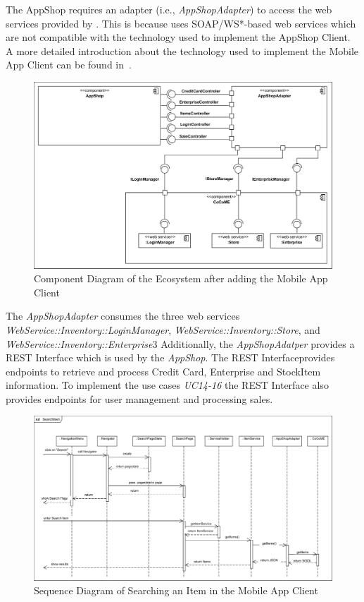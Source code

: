 The AppShop requires an adapter (i.e., \textit{AppShopAdapter}) to access the web services provided by \CoCoME. %
This is because \CoCoME uses SOAP/WS*-based web services which are not compatible with the technology used to implement the AppShop Client. 
A more detailed introduction about the technology used to implement the Mobile App Client can be found in~\cite{schnabel}. 
  
 \begin{figure}[!h]
	\includegraphics[width=\textwidth]{img/appComponent.png}
	\caption{Component Diagram of the \CoCoME Ecosystem after adding the Mobile App Client}
	\label{ComponentApp}
\end{figure}

The \textit{AppShopAdapter} consumes the three web services \textit{WebService::Inventory::LoginManager}, \textit{WebService::Inventory::Store}, and \textit{WebService::Inventory::Enterprise}3
Additionally, the \textit{AppShopAdatper} provides a REST Interface which is used by the \textit{AppShop}. 
The REST Interfaceprovides endpoints to retrieve and process Credit Card, Enterprise and StockItem information. 
To implement the use cases \emph{UC14-16} the REST Interface also provides endpoints for user management and processing sales. 
  
\begin{figure}[!h]
	\includegraphics[width=\textwidth]{img/appSearchSequence.png}
	\caption{Sequence Diagram of Searching an Item in the Mobile App Client}
	\label{SequenceAppSearch}
\end{figure}

